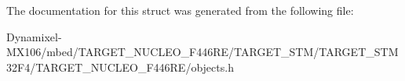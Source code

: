 The documentation for this struct was generated from the following file\+:\begin{DoxyCompactItemize}
\item 
Dynamixel-\/\+M\+X106/mbed/\+T\+A\+R\+G\+E\+T\+\_\+\+N\+U\+C\+L\+E\+O\+\_\+\+F446\+R\+E/\+T\+A\+R\+G\+E\+T\+\_\+\+S\+T\+M/\+T\+A\+R\+G\+E\+T\+\_\+\+S\+T\+M32\+F4/\+T\+A\+R\+G\+E\+T\+\_\+\+N\+U\+C\+L\+E\+O\+\_\+\+F446\+R\+E/objects.\+h\end{DoxyCompactItemize}
